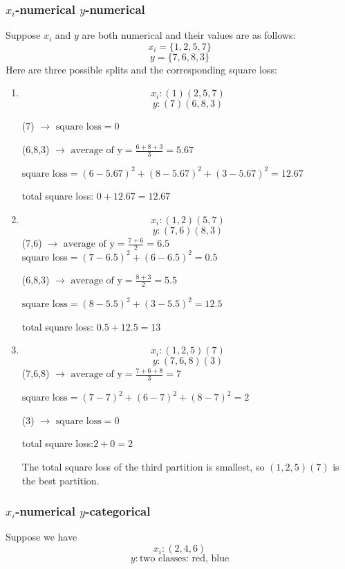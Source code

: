 \documentclass{article}
\begin{document}
\subsubsection{
$x_i$-numerical $y$-numerical}
	Suppose $x_i$ and $y$ are both numerical and their values are as follows:
	\[x_i=\{1,2,5,7\}\]
\[y=\{7,6,8,3\}\]	
Here are three possible splits and the corresponding square loss:
\begin{enumerate}
	\item \[x_i:(1)(2,5,7)\]
	\[y:(7)(6,8,3)\]

	(7) $\rightarrow$ \(\text{square loss}=0\)

(6,8,3) $\rightarrow$ \(\text{average of y}=\frac{6+8+3}{3}=5.67\)

\medspace \(\text{square loss}=(6-5.67)^2+(8-5.67)^2+(3-5.67)^2=12.67\)
 
 total square loss: \(0+12.67=12.67\)
 
 \item \[x_i:(1,2)(5,7)\]
 \[y:(7,6)(8,3)\]
 	(7,6) $\rightarrow$  \(\text{average of y}=\frac{7+6}{2}=6.5\)
 	 \(\text{square loss}=(7-6.5)^2+(6-6.5)^2=0.5\)
 	
 	(6,8,3) $\rightarrow$ \(\text{average of y}=\frac{8+3}{2}=5.5\)
 	
 	\(\text{square loss}=(8-5.5)^2+(3-5.5)^2=12.5\)
 	
 	total square loss: \(0.5+12.5=13\)
 	
 \item \[x_i:(1,2,5)(7)\]
 \[y:(7,6,8)(3)\]
 (7,6,8) $\rightarrow$  \(\text{average of y}=\frac{7+6+8}{3}=7\)
 
 \(\text{square loss}=(7-7)^2+(6-7)^2+(8-7)^2=2\)
 
 (3) $\rightarrow$ \(\text{square loss}=0\)
 
 total square loss:\(2+0=2\)
 
 \medskip
 The total square loss of the third partition is smallest, so $(1,2,5)(7)$ is the best partition.

\end{enumerate}

\subsubsection{$x_i$-numerical $y$-categorical}
Suppose we have
\[x_i:(2,4,6)\]
\[y:\text{two classes: red, blue}\]
\end{document}
